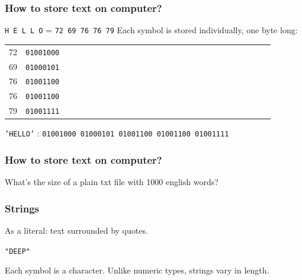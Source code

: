 \documentclass[11pt]{beamer}
\begin{document}
\begin{frame}
  \frametitle{How to store text on computer?}
  \Enlarge

  \begin{itemize}
  \myitem \texttt{H E L L O} = \texttt{72 69 76 76 79} \pause
  \myitem  Each symbol is stored individually, one byte long: \\
   \vspace{2mm} \pause
    \begin{tabular}{*{27}{l}}
      72 & \texttt{01001000} \\
      69 & \texttt{01000101} \\
      76 & \texttt{01001100} \\
      76 & \texttt{01001100} \\
      79 & \texttt{01001111} \\
    \end{tabular} \pause
    
    \vspace{2mm}
    {\small \texttt{'HELLO'} : \textcolor{CS101GradBot}{\texttt{01001000 01000101 01001100 01001100 01001111}}}
  \end{itemize}
\end{frame}

\begin{frame}
  \frametitle{How to store text on computer?}
  \Enlarge

  \begin{itemize}
   \myitem What's the size of a plain txt file with 1000 english words? 
  \end{itemize}
\end{frame}

\begin{frame}
  \frametitle{Strings}
  \Enlarge

  \begin{itemize}
  \myitem  As a literal:  text surrounded by quotes.
    \begin{itemize}
    \mysubitem  \texttt{"DEEP"}
    \end{itemize} \pause
  \myitem  Each symbol is a character. \pause
  \myitem  Unlike numeric types, strings vary in length.
  \end{itemize}
\end{frame}
\end{document}
